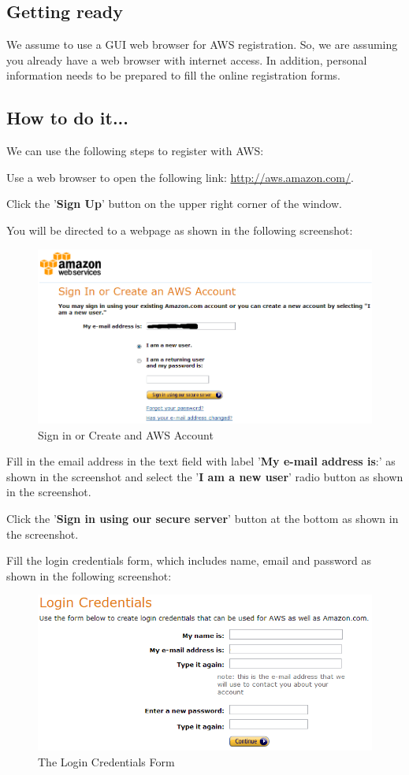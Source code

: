 \subsection*{Getting ready}
We assume to use a GUI web browser for AWS registration. So, we are assuming you already have a web browser with internet access. In addition, personal information needs to be prepared to fill the online registration forms.
\subsection*{How to do it...}
We can use the following steps to register with AWS:

Use a web browser to open the following link: \url{http://aws.amazon.com/}.

Click the '\textbf{Sign Up}' button on the upper right corner of the window.

You will be directed to a webpage as shown in the following screenshot:
\begin{figure}[h]
  \centering
  \includegraphics[width=.8\textwidth]{figs/5163os_08_01.png}
  \caption{Sign in or Create and AWS Account}\label{fig:aws.signin}
\end{figure} 

Fill in the email address in the text field with label '\textbf{My e-mail address is}:' as shown in the screenshot and select the '\textbf{I am a new user}' radio button as shown in the screenshot.

Click the '\textbf{Sign in using our secure server}' button at the bottom as shown in the screenshot.

Fill the login credentials form, which includes name, email and password as shown in the following screenshot:
\begin{figure}[h]
  \centering
  \includegraphics[width=.8\textwidth]{figs/5163os_08_02.png}
  \caption{The Login Credentials Form}\label{fig:login.credentials}
\end{figure} 

